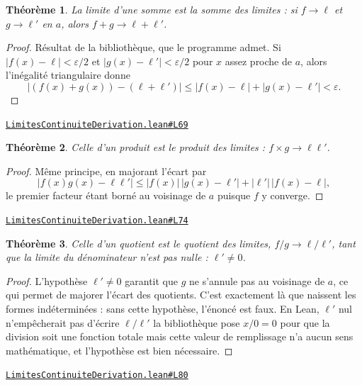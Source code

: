 \documentclass[11pt,a4paper]{article}
\theoremstyle{definition}
\theoremstyle{plain}
\newtheorem{theoreme}{Théorème}
\newcommand{\source}[2]{\par\smallskip\noindent\hfill{\footnotesize\href{#1}{\texttt{#2}}}\par\smallskip}
\begin{document}
\begin{theoreme}
La limite d'une somme est la somme des limites : si $f \to \ell$ et $g \to \ell'$ en $a$,
alors $f + g \to \ell + \ell'$.
\end{theoreme}

\begin{proof}
Résultat de la bibliothèque, que le programme admet. Si $|f(x) - \ell| < \varepsilon/2$ et
$|g(x) - \ell'| < \varepsilon/2$ pour $x$ assez proche de $a$, alors l'inégalité
triangulaire donne
\[ \bigl|(f(x) + g(x)) - (\ell + \ell')\bigr|
   \le |f(x) - \ell| + |g(x) - \ell'| < \varepsilon . \]
\end{proof}
\source{https://github.com/Commutator-IO/learn-lean/blob/main/cours/02-lycee/04-limites-continuite-derivation/LimitesContinuiteDerivation.lean\#L69}{LimitesContinuiteDerivation.lean\#L69}

\begin{theoreme}
Celle d'un produit est le produit des limites : $f \times g \to \ell\ell'$.
\end{theoreme}

\begin{proof}
Même principe, en majorant l'écart par
\[ |f(x)g(x) - \ell\ell'| \le |f(x)|\,|g(x) - \ell'| + |\ell'|\,|f(x) - \ell| , \]
le premier facteur étant borné au voisinage de $a$ puisque $f$ y converge.
\end{proof}
\source{https://github.com/Commutator-IO/learn-lean/blob/main/cours/02-lycee/04-limites-continuite-derivation/LimitesContinuiteDerivation.lean\#L74}{LimitesContinuiteDerivation.lean\#L74}

\begin{theoreme}
Celle d'un quotient est le quotient des limites, $f/g \to \ell/\ell'$, tant que la limite
du dénominateur n'est pas nulle : $\ell' \ne 0$.
\end{theoreme}

\begin{proof}
L'hypothèse $\ell' \ne 0$ garantit que $g$ ne s'annule pas au voisinage de $a$, ce qui
permet de majorer l'écart des quotients. C'est exactement là que naissent les formes
indéterminées : sans cette hypothèse, l'énoncé est faux. En Lean, $\ell'$ nul n'empêcherait
pas d'écrire $\ell/\ell'$ \textemdash{} la bibliothèque pose $x/0 = 0$ pour que la division
soit une fonction totale \textemdash{} mais cette valeur de remplissage n'a aucun sens
mathématique, et l'hypothèse est bien nécessaire.
\end{proof}
\source{https://github.com/Commutator-IO/learn-lean/blob/main/cours/02-lycee/04-limites-continuite-derivation/LimitesContinuiteDerivation.lean\#L80}{LimitesContinuiteDerivation.lean\#L80}
\end{document}

